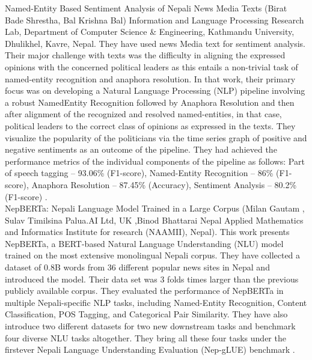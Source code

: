 Named-Entity Based Sentiment Analysis of Nepali News Media Texts
(Birat Bade Shrestha, Bal Krishna Bal)
Information and Language Processing Research Lab,
Department of Computer Science \& Engineering,
Kathmandu University, Dhulikhel, Kavre, Nepal. They have used news Media text for sentiment analysis. Their major
challenge with texts was the difficulty
in aligning the expressed opinions with the
concerned political leaders as this entails a
non-trivial task of named-entity
recognition and anaphora resolution. In
that work, their primary focus was on
developing a Natural Language Processing
(NLP) pipeline involving a robust NamedEntity Recognition followed by Anaphora
Resolution and then after alignment of the
recognized and resolved named-entities, in
that case, political leaders to the correct
class of opinions as expressed in the texts.
They visualize the popularity of the
politicians via the time series graph of
positive and negative sentiments as an
outcome of the pipeline. They had
achieved the performance metrics of the
individual components of the pipeline as
follows: Part of speech tagging – 93.06\%
(F1-score), Named-Entity Recognition –
86\% (F1-score), Anaphora Resolution –
87.45\% (Accuracy), Sentiment Analysis –
80.2\% (F1-score) \cite{bade-shrestha-bal-2020-named}.\\

NepBERTa: Nepali Language Model Trained in a Large Corpus
(Milan Gautam
, Sulav Timilsina
Palua.AI Ltd, UK ,Binod Bhattarai
Nepal Applied Mathematics and
Informatics Institute for research (NAAMII), Nepal). This work presents NepBERTa, a BERT-based Natural Language Understanding (NLU) model trained on the most extensive monolingual Nepali corpus.
They have collected a dataset of 0.8B words from 36
different popular news sites in Nepal and introduced the model. Their data set was 3 folds times
larger than the previous publicly available corpus. They evaluated the performance of NepBERTa in multiple Nepali-specific NLP tasks,
including Named-Entity Recognition, Content
Classification, POS Tagging, and Categorical
Pair Similarity. 
They have also introduce two different datasets for two new downstream tasks and
benchmark four diverse NLU tasks altogether. They bring all these four tasks under the firstever Nepali Language Understanding Evaluation (Nep-gLUE) benchmark \cite{timilsina-etal-2022-nepberta}.\\

